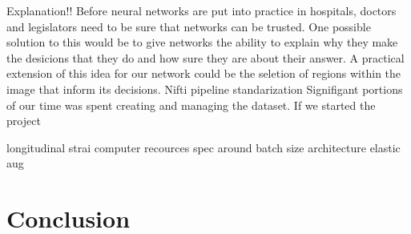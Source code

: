 \documentclass[12pt]{article}
\begin{document}
Explanation!!
Before neural networks are put into practice in hospitals, doctors and legislators need to be sure that networks can be trusted.
One possible solution to this would be to give networks the ability to explain why they make the desicions that they do and how sure they are about their answer.
A practical extension of this idea for our network could be the seletion of regions within the image that inform its decisions.
Nifti pipeline standarization
Signifigant portions of our time was spent creating and managing the dataset.
If we started the project

longitudinal strai
computer recources
spec around batch size
architecture
elastic aug
\section{Conclusion}


%

\end{document}
